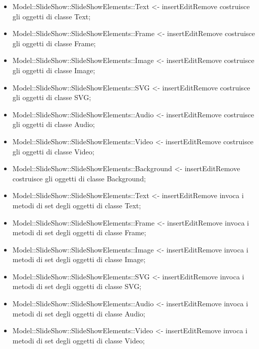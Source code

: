 {\begin{itemize}
		\item Model::\-SlideShow::\-SlideShowElements::\-Text <- insertEditRemove costruisce gli oggetti di classe Text;
		\item Model::\-SlideShow::\-SlideShowElements::\-Frame <- insertEditRemove costruisce gli oggetti di classe Frame;
		\item Model::\-SlideShow::\-SlideShowElements::\-Image <- insertEditRemove costruisce gli oggetti di classe Image;
		\item Model::\-SlideShow::\-SlideShowElements::\-SVG <- insertEditRemove costruisce gli oggetti di classe SVG;
		\item Model::\-SlideShow::\-SlideShowElements::\-Audio <- insertEditRemove costruisce gli oggetti di classe Audio;
		\item Model::\-SlideShow::\-SlideShowElements::\-Video <- insertEditRemove costruisce gli oggetti di classe Video;
		\item Model::\-SlideShow::\-SlideShowElements::\-Background <- insertEditRemove costruisce gli oggetti di classe Background;
	   \item Model::\-SlideShow::\-SlideShowElements::\-Text <- insertEditRemove invoca i metodi di set degli oggetti di classe Text;
	   \item Model::\-SlideShow::\-SlideShowElements::\-Frame <- insertEditRemove invoca i metodi di set degli oggetti di classe Frame;
		\item Model::\-SlideShow::\-SlideShowElements::\-Image <- insertEditRemove invoca i metodi di set degli oggetti di classe Image;
		\item Model::\-SlideShow::\-SlideShowElements::\-SVG <- insertEditRemove invoca i metodi di set degli oggetti di classe SVG;
		\item Model::\-SlideShow::\-SlideShowElements::\-Audio <- insertEditRemove invoca i metodi di set degli oggetti di classe Audio;
		\item Model::\-SlideShow::\-SlideShowElements::\-Video <- insertEditRemove invoca i metodi di set degli oggetti di classe Video;
	\end{itemize} 
}	

